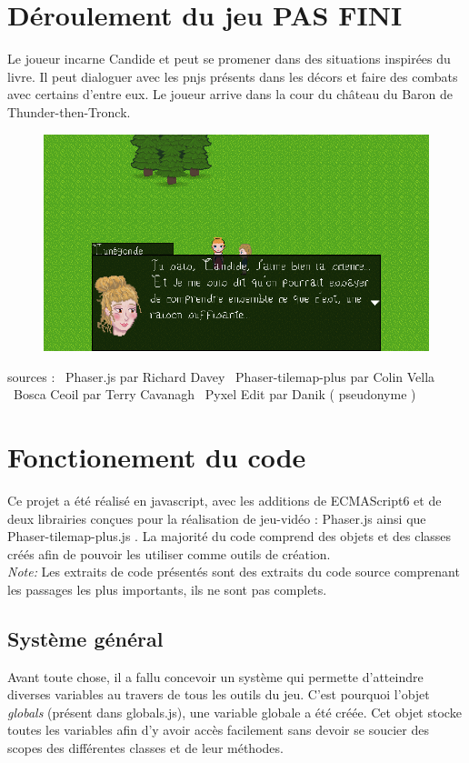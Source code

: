 \documentclass[11pt]{article}
\begin{document}
\section{Déroulement du jeu PAS FINI}
Le joueur incarne Candide et peut se promener dans des situations inspirées du livre. Il peut dialoguer avec les pnjs présents dans les décors et faire des combats avec certains d'entre eux. Le joueur arrive dans la cour du château du Baron de Thunder-then-Tronck. 
\begin{figure}[h]
\includegraphics[scale=0.33]{cunegondeScn}
\centering
\end{figure}
sources : \
Phaser.js par Richard Davey \
Phaser-tilemap-plus par Colin Vella \
Bosca Ceoil par Terry Cavanagh \
Pyxel Edit par Danik ( pseudonyme )\


\section{Fonctionement du code}
Ce projet a été réalisé en javascript, avec les additions de ECMAScript6 et de deux librairies conçues pour la réalisation de jeu-vidéo : Phaser.js ainsi que Phaser-tilemap-plus.js . La majorité du code comprend des objets et des classes créés afin de pouvoir les utiliser comme outils de création.\\

\textit{Note:} Les extraits de code présentés sont des extraits du code source comprenant les passages les plus importants, ils ne sont pas complets.

\subsection{Système général}
	Avant toute chose, il a fallu concevoir un système qui permette d'atteindre diverses variables au travers de tous les outils du jeu. C'est pourquoi l'objet \textit{globals} (présent dans globals.js), une variable globale a été créée. Cet objet stocke toutes les variables afin d'y avoir accès facilement sans devoir se soucier des scopes des différentes classes et de leur méthodes.\\
	
\end{document}
